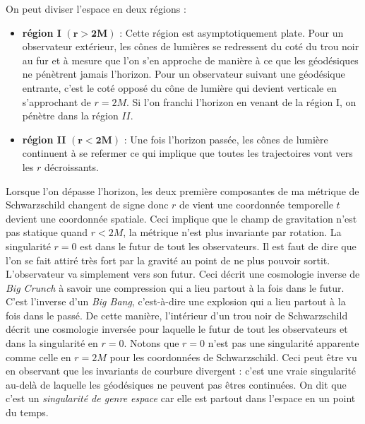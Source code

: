 \documentclass[a4paper,11pt]{report}
\begin{document}
            On peut diviser l'espace en deux régions :
            \begin{itemize}[label = \textbullet]
                \item \textbf{région I} $(\boldsymbol{r>2M})$ :  Cette région est asymptotiquement plate. Pour un observateur extérieur, les cônes de lumières se redressent du coté du trou noir au fur et à mesure que l'on s'en approche de manière à ce que les géodésiques ne pénètrent jamais l'horizon. Pour un observateur suivant une géodésique entrante, c'est le coté opposé du cône de lumière qui devient verticale en s'approchant de $r=2M$. Si l'on franchi l'horizon en venant de la région I, on pénètre dans la région $II$. 
                \item \textbf{région II} $(\boldsymbol{r<2M})$ : Une fois l'horizon passée, les cônes de lumière continuent à se refermer ce qui implique que toutes les trajectoires vont vers les $r$ décroissants.
            \end{itemize}
            Lorsque l'on dépasse l'horizon, les deux première composantes de ma métrique de Schwarzschild changent de signe donc $r$ de vient une coordonnée temporelle $t$ devient une coordonnée spatiale. Ceci implique que le champ de gravitation n'est pas statique quand $r<2M$, la métrique n'est plus invariante par rotation. La singularité $r=0$ est dans le futur de tout les observateurs. Il est faut de dire que l'on se fait attiré très fort par la gravité au point de ne plus pouvoir sortit. L'observateur va simplement vers son futur. Ceci décrit une cosmologie inverse de \textit{Big Crunch} à savoir une compression qui a lieu partout à la fois dans le futur. C'est l'inverse d'un \textit{Big Bang}, c'est-à-dire une explosion qui a lieu partout à la fois dans le passé. De cette manière, l'intérieur d'un trou noir de Schwarzschild décrit une cosmologie inversée pour laquelle le futur de tout les observateurs et dans la singularité en $r=0$. Notons que $r=0$ n'est pas une singularité apparente comme celle en $r=2M$ pour les coordonnées de Schwarzschild. Ceci peut être vu en observant que les invariants de courbure divergent : c'est une vraie singularité au-delà de laquelle les géodésiques ne peuvent pas êtres continuées. On dit que c'est un \textit{singularité de genre espace} car elle est partout dans l'espace en un point du temps.\\
            
            
\end{document}
